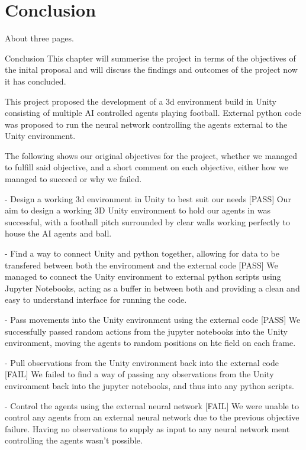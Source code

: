 
\chapter{Conclusion}
About three pages.

Conclusion
This chapter will summerise the project in terms of the objectives of the inital proposal and will discuss the findings and outcomes of the project now it has concluded.

This project proposed the development of a 3d environment build in Unity consisting of multiple AI controlled agents playing football. External python code was proposed to run the neural network controlling the agents external to the Unity environment. 

The following shows our original objectives for the project, whether we managed to fulfill said objective, and a short comment on each objective, either how we managed to succeed or why we failed.

- Design a working 3d environment in Unity to best suit our needs
[PASS]
Our aim to design a working 3D Unity environment to hold our agents in was successful, with a football pitch surrounded by clear walls working perfectly to house the AI agents and ball.

- Find a way to connect Unity and python together, allowing for data to be transfered between both the environment and the external code
[PASS]
We managed to connect the Unity environment to external python scripts using Jupyter Notebooks, acting as a buffer in between both and providing a clean and easy to understand interface for running the code.

- Pass movements into the Unity environment using the external code
[PASS]
We successfully passed random actions from the jupyter notebooks into the Unity environment, moving the agents to random positions on hte field on each frame.

- Pull observations from the Unity environment back into the external code
[FAIL]
We failed to find a way of passing any observations from the Unity environment back into the jupyter notebooks, and thus into any python scripts.

- Control the agents using the external neural network
[FAIL]
We were unable to control any agents from an external neural network due to the previous objective failure. Having no observations to supply as input to any neural network ment controlling the agents wasn't possible.



